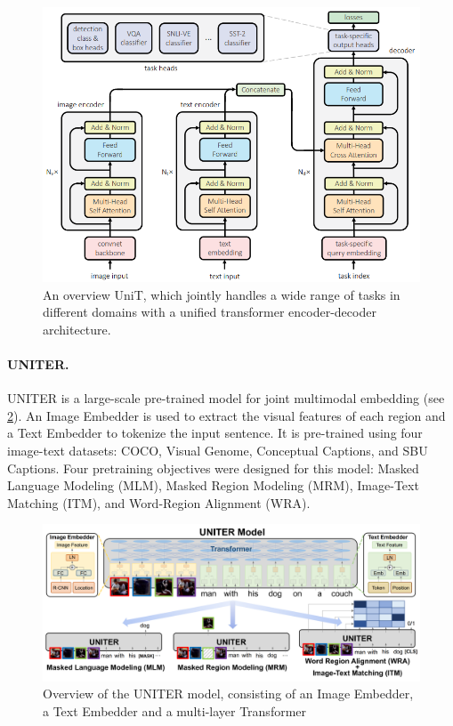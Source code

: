 \begin{figure}[ht]
    \centering
    \includegraphics[width=0.7\linewidth]{images/models/unit.png}
    \caption{An overview UniT, which jointly handles a wide range of tasks in different domains with a unified transformer encoder-decoder architecture.}
    \label{fig:unit}
\end{figure}

\paragraph{UNITER.} UNITER \cite{chen2020uniter} is a large-scale pre-trained model for joint multimodal embedding (see \cref{fig:uniter}). An Image Embedder is used to extract the visual features of each region and a Text Embedder to tokenize the input sentence. It is pre-trained using four image-text datasets: COCO, Visual Genome, Conceptual Captions, and SBU Captions. Four pretraining objectives were designed for this model: Masked Language Modeling (MLM), Masked Region Modeling (MRM), Image-Text Matching (ITM), and Word-Region Alignment (WRA).

\begin{figure}[ht]
    \centering
    \includegraphics[width=\linewidth]{images/models/uniter.png}
    \caption{Overview of the UNITER model, consisting of an Image Embedder, a Text Embedder and a multi-layer Transformer}
    \label{fig:uniter}
\end{figure}

